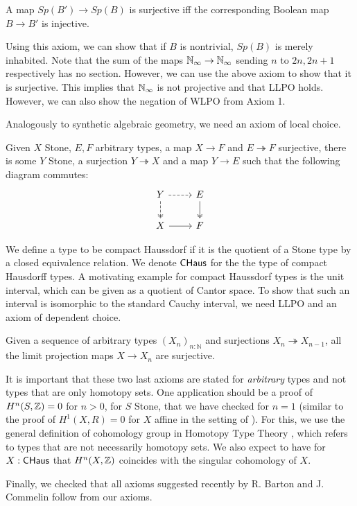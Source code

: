 \documentclass{../util/zariski}
\begin{document}
\begin{axiom}
  A map $Sp(B')\to Sp(B)$ is surjective iff the corresponding Boolean map $B \to B'$ is injective.
\end{axiom} 
Using this axiom, we can show that if $B$ is nontrivial, $Sp(B)$ is merely inhabited.
%
%
Note that the sum of the maps $\mathbb{N}_{\infty} \to \mathbb{N}_{\infty}$ sending $n$ to $2n,2n+1$ respectively has no section. 
However, we can use the above axiom to show that it is surjective. 
This implies that $\mathbb{N}_{\infty}$ is not projective and that LLPO holds. 
However, we can also show the negation of WLPO from Axiom 1.  

\medskip

Analogously to synthetic algebraic geometry, we need an axiom of local choice. 
\begin{axiom}
  Given $X$ Stone, $E,F$ arbitrary types, a map $X \to F$ and $E\twoheadrightarrow F$ surjective, 
  there is some $Y$ Stone,
    a surjection $Y \twoheadrightarrow X$ and a map $Y\to E$ such that the following diagram commutes:
    \begin{equation*}\begin{tikzcd}
      Y \arrow [d, two heads,dashed] \arrow [r,dashed] & E \arrow[d,""',two heads]\\
      X \arrow[r] & F
    \end{tikzcd}\end{equation*}  
\end{axiom} 

We define a type to be compact Haussdorf if it is the quotient of a Stone type by a closed equivalence relation. 
We denote $\mathsf{CHaus}$ for the the type of compact Hausdorff types. 
A motivating example for compact Haussdorf types is the unit interval, which can be given as a quotient of Cantor space. 
To show that such an interval is isomorphic to the standard Cauchy interval, 
we need LLPO and an axiom of dependent choice. 
\begin{axiom}
  Given a sequence of arbitrary types $(X_n)_{n:\mathbb N}$ and surjections $X_n \twoheadrightarrow X_{n-1}$, 
  all the limit projection maps $X \to X_n$ are surjective. 
\end{axiom}


It is important that these two last axioms are stated for {\em arbitrary} types and not types that are only
homotopy sets. One application should be a proof of $H^n(S,\mathbb{Z}) = 0$ for $n>0$, for $S$ Stone,
that we have checked for $n = 1$ (similar to the proof of $H^1(X,R) = 0$ for $X$ affine in the setting of \cite{draft}).
For this, we use the general definition of cohomology group in Homotopy Type Theory \cite{hott}, which refers to
types that are not necessarily homotopy sets.
We also expect to have for $X:\mathsf{CHaus}$ that $H^n(X,\mathbb{Z})$ coincides with the singular cohomology of $X$.

 Finally, we checked that all axioms suggested recently by R. Barton and J. Commelin \cite{bc24} follow from our axioms.





\printbibliography
\end{document}

